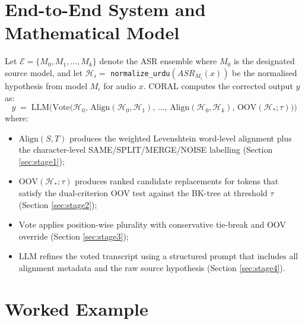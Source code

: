 \section{End-to-End System and Mathematical Model}
\label{sec:e2e-math}

Let $\mathcal{E} = \{M_0, M_1, \ldots, M_k\}$ denote the ASR ensemble where $M_0$ is the designated source model, and let $\mathcal{H}_i = $ \texttt{normalize\_urdu}$(\textit{ASR}_{M_i}(x))$ be the normalised hypothesis from model $M_i$ for audio $x$. CORAL computes the corrected output $y$ as:
\[
y \;=\; \mathrm{LLM}\!\Big(
 \mathrm{Vote}\big(\mathcal{H}_0,\,\mathrm{Align}(\mathcal{H}_0,\mathcal{H}_1),\,\ldots,\,\mathrm{Align}(\mathcal{H}_0,\mathcal{H}_k),\,\mathrm{OOV}(\mathcal{H}_*; \tau)\big)
\Big)
\]
where:
\begin{itemize}
 \item $\mathrm{Align}(S, T)$ produces the weighted Levenshtein word-level alignment plus the character-level SAME/SPLIT/MERGE/NOISE labelling (Section \ref{sec:stage1});
 \item $\mathrm{OOV}(\mathcal{H}_*; \tau)$ produces ranked candidate replacements for tokens that satisfy the dual-criterion OOV test against the BK-tree at threshold $\tau$ (Section \ref{sec:stage2});
 \item $\mathrm{Vote}$ applies position-wise plurality with conservative tie-break and OOV override (Section \ref{sec:stage3});
 \item $\mathrm{LLM}$ refines the voted transcript using a structured prompt that includes all alignment metadata and the raw source hypothesis (Section \ref{sec:stage4}).
\end{itemize}

\section{Worked Example}
\label{sec:worked-example}

